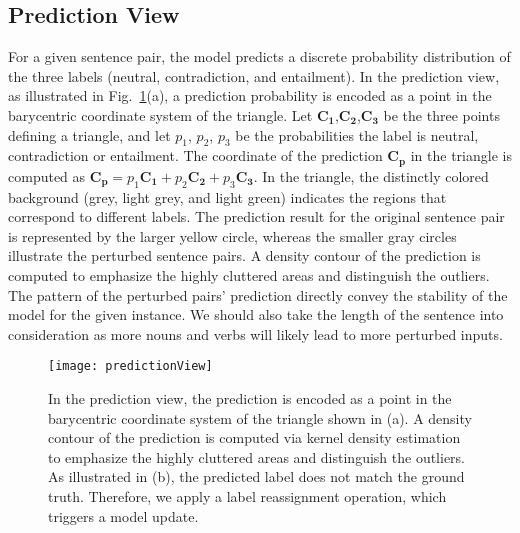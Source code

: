 
\subsection{Prediction View}
\label{sec:prediction}
For a given sentence pair, the model predicts a discrete probability distribution of the three labels (neutral, contradiction, and entailment).
%
In the prediction view, as illustrated in Fig.~\ref{fig:predictionView}(a), a prediction probability is encoded as a point in the barycentric coordinate system of the triangle.
Let $\mathbf{C_1}$,$\mathbf{C_2}$,$\mathbf{C_3}$ be the three points defining a triangle, and let $p_1$, $p_2$, $p_3$ be the probabilities the label is neutral, contradiction or entailment. The coordinate of the prediction $\mathbf{C_p}$ in the triangle is computed as $\mathbf{C_p} = p_1\mathbf{C_1}+p_2\mathbf{C_2}+p_3\mathbf{C_3}$.
In the triangle, the distinctly colored background (grey, light grey, and light green) indicates the regions that correspond to different labels. The prediction result for the original sentence pair is represented by the larger yellow circle, whereas the smaller gray circles illustrate the perturbed sentence pairs. A density contour of the prediction is computed to emphasize the highly cluttered areas and distinguish the outliers.
The pattern of the perturbed pairs' prediction directly convey the stability of the model for the given instance. 
We should also take the length of the sentence into consideration as more nouns and verbs will likely lead to more perturbed inputs.

\begin{figure}[htbp]
\centering
\vspace{-2mm}
 \texttt{[image: predictionView]}
 \vspace{-5mm}
 \caption{
In the prediction view, the prediction is encoded as a point in the barycentric coordinate system of the triangle shown in (a).
A density contour of the prediction is computed via kernel density estimation to emphasize the highly cluttered areas and distinguish the outliers.
As illustrated in (b), the predicted label does not match the ground truth. Therefore, we apply a label reassignment operation, which triggers a model update.
}
\vspace{-2mm}
\label{fig:predictionView}
\end{figure}

